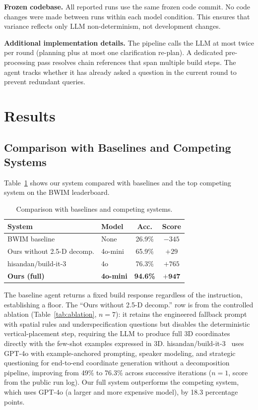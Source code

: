 \documentclass{article}
\begin{document}
\textbf{Frozen codebase.} All reported runs use the same frozen code
commit. No code changes were made between runs within each model condition.
This ensures that variance reflects only LLM non-determinism, not
development changes.

\textbf{Additional implementation details.} The pipeline calls the LLM at
most twice per round (planning plus at most one clarification re-plan).
A dedicated pre-processing pass resolves chain references that span
multiple build steps. The agent tracks whether it has already asked a
question in the current round to prevent redundant queries.

\section{Results}
\label{sec:results}

\subsection{Comparison with Baselines and Competing Systems}

Table~\ref{tab:baselines} shows our system compared with baselines and
the top competing system on the BWIM leaderboard.

\begin{table}[ht]
\centering
\small
\begin{tabular}{@{}l@{\hskip 6pt}lcc@{}}
\toprule
\textbf{System} & \textbf{Model} & \textbf{Acc.} & \textbf{Score} \\
\midrule
BWIM baseline~\cite{baseline} & None & 26.9\% & $-345$ \\
Ours without 2.5-D decomp. & 4o-mini & 65.9\% & $+29$ \\
hisandan/build-it-3~\cite{hisandan} & 4o & 76.3\% & $+765$ \\
\textbf{Ours (full)} & \textbf{4o-mini} & \textbf{94.6\%} & $\boldsymbol{+947}$ \\
\bottomrule
\end{tabular}
\caption{Comparison with baselines and competing systems.}
\label{tab:baselines}
\end{table}

The baseline agent returns a fixed build response regardless of the
instruction, establishing a floor.
The ``Ours without 2.5-D decomp.'' row is from the controlled ablation
(Table~\ref{tab:ablation}, $n = 7$): it retains the engineered fallback
prompt with spatial rules and underspecification questions but disables
the deterministic vertical-placement step, requiring the LLM to produce
full 3D coordinates directly with the few-shot examples expressed in 3D.
hisandan/build-it-3~\cite{hisandan} uses GPT-4o with example-anchored
prompting, speaker modeling, and strategic questioning for end-to-end
coordinate generation without a decomposition pipeline, improving from
49\% to 76.3\% across successive iterations ($n = 1$, score from the
public run log).
Our full system outperforms the competing system, which uses GPT-4o
(a larger and more expensive model), by 18.3 percentage points.
\end{document}

